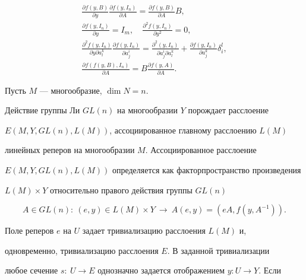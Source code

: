 \begin{gather*}


\frac{\partial f(y,B)}{\partial y}\frac{\partial f(y,I_n)}


{\partial A}=\frac{\partial f(y,B)}{\partial A}B,\\


\frac{\partial f(y,I_n)}{\partial y}=I_m,\quad


\frac{\partial^2 f(y,I_n)}{\partial y^2}=0, \\


%


\frac{\partial^2f(y,I_n)}{\partial y\partial a^k_l}


\frac{\partial f(y,I_n)}{\partial a^i_j}=


\frac{\partial^2(y,I_n)}{\partial a^i_j\partial a^k_l}+


\frac{\partial f(y,I_n)}{\partial a^k_j}\delta^l_i, \\


%


\frac{\partial f(f(y,B),I_n)}{\partial A}=B


\frac{\partial f(y,A)}{\partial A}.


\end{gather*}





Пусть $M$ --- многообразие, $\dim N=n$.


Действие группы Ли $GL(n)$ на многообразии $Y$ порождает расслоение


$E(M,Y,GL(n),L(M))$, ассоциированное главному расслоению $L(M)$


линейных реперов на многообразии $M$. Ассоциированное расслоение


$E(M,Y,GL(n),L(M))$ определяется как факторпространство произведения


$L(M)\times Y$ относительно правого действия группы $GL(n)$


$$


A\in GL(n):\ (e,y)\in L(M)\times Y\ \to \ A(e,y)=(eA,f(y,A^{-1})).


$$





Поле реперов $e$ на $U$ задает тривиализацию расслоения $L(M)$ и, 


одновременно, тривиализацию расслоения $E$. В заданной тривиализации 


любое сечение $s:\ U\to E$ однозначно задается отображением $y: U\to Y$. Если


